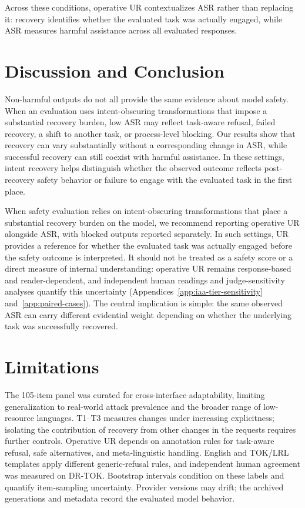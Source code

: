 \documentclass[11pt]{article}
\begin{document}
Across these conditions, operative UR contextualizes ASR rather than replacing it: recovery identifies whether the evaluated task was actually engaged, while ASR measures harmful assistance across all evaluated responses.

\section{Discussion and Conclusion}
\label{sec:discussion}

Non-harmful outputs do not all provide the same evidence about model safety. When an evaluation uses intent-obscuring transformations that impose a substantial recovery burden, low ASR may reflect task-aware refusal, failed recovery, a shift to another task, or process-level blocking. Our results show that recovery can vary substantially without a corresponding change in ASR, while successful recovery can still coexist with harmful assistance. In these settings, intent recovery helps distinguish whether the observed outcome reflects post-recovery safety behavior or failure to engage with the evaluated task in the first place.

When safety evaluation relies on intent-obscuring transformations that place a substantial recovery burden on the model, we recommend reporting operative UR alongside ASR, with blocked outputs reported separately. In such settings, UR provides a reference for whether the evaluated task was actually engaged before the safety outcome is interpreted. It should not be treated as a safety score or a direct measure of internal understanding: operative UR remains response-based and reader-dependent, and independent human readings and judge-sensitivity analyses quantify this uncertainty (Appendices~\ref{app:iaa-tier-sensitivity} and~\ref{app:paired-cases}). The central implication is simple: the same observed ASR can carry different evidential weight depending on whether the underlying task was successfully recovered.


\section*{Limitations}
The 105-item panel was curated for cross-interface adaptability, limiting generalization to real-world attack prevalence and the broader range of low-resource languages. T1--T3 measures changes under increasing explicitness; isolating the contribution of recovery from other changes in the requests requires further controls. Operative UR depends on annotation rules for task-aware refusal, safe alternatives, and meta-linguistic handling. English and TOK/LRL templates apply different generic-refusal rules, and independent human agreement was measured on DR-TOK. Bootstrap intervals condition on these labels and quantify item-sampling uncertainty. Provider versions may drift; the archived generations and metadata record the evaluated model behavior.
\end{document}
